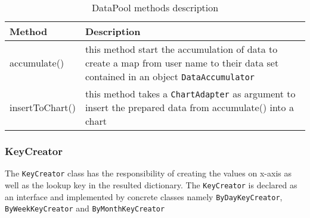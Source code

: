 \begin{table}[h]
\begin{center}
    \begin{tabular}{| l | p{12cm} |}
        \hline Method & Description \\
        \hline accumulate() & 
            this method start the accumulation of data to create a map from user name to their data set contained in an
            object \texttt{DataAccumulator} \\
        \hline insertToChart() &
            this method takes a \texttt{ChartAdapter} as argument to insert the prepared data from accumulate() into a
            chart \\
        \hline
    \end{tabular}
    \caption{DataPool methods description}
\end{center}
\end{table}

\subsubsection{KeyCreator}
The \texttt{KeyCreator} class has the responsibility of creating the values on x-axis as well as the lookup key in the
resulted dictionary. The \texttt{KeyCreator} is declared as an interface and implemented by concrete classes namely
\texttt{ByDayKeyCreator}, \texttt{ByWeekKeyCreator} and \texttt{ByMonthKeyCreator}


